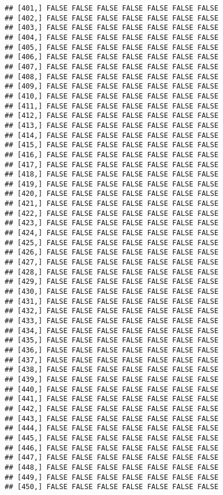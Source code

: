 \documentclass[
]{article}
\begin{document}
\begin{verbatim}
## [401,] FALSE FALSE FALSE FALSE FALSE FALSE FALSE
## [402,] FALSE FALSE FALSE FALSE FALSE FALSE FALSE
## [403,] FALSE FALSE FALSE FALSE FALSE FALSE FALSE
## [404,] FALSE FALSE FALSE FALSE FALSE FALSE FALSE
## [405,] FALSE FALSE FALSE FALSE FALSE FALSE FALSE
## [406,] FALSE FALSE FALSE FALSE FALSE FALSE FALSE
## [407,] FALSE FALSE FALSE FALSE FALSE FALSE FALSE
## [408,] FALSE FALSE FALSE FALSE FALSE FALSE FALSE
## [409,] FALSE FALSE FALSE FALSE FALSE FALSE FALSE
## [410,] FALSE FALSE FALSE FALSE FALSE FALSE FALSE
## [411,] FALSE FALSE FALSE FALSE FALSE FALSE FALSE
## [412,] FALSE FALSE FALSE FALSE FALSE FALSE FALSE
## [413,] FALSE FALSE FALSE FALSE FALSE FALSE FALSE
## [414,] FALSE FALSE FALSE FALSE FALSE FALSE FALSE
## [415,] FALSE FALSE FALSE FALSE FALSE FALSE FALSE
## [416,] FALSE FALSE FALSE FALSE FALSE FALSE FALSE
## [417,] FALSE FALSE FALSE FALSE FALSE FALSE FALSE
## [418,] FALSE FALSE FALSE FALSE FALSE FALSE FALSE
## [419,] FALSE FALSE FALSE FALSE FALSE FALSE FALSE
## [420,] FALSE FALSE FALSE FALSE FALSE FALSE FALSE
## [421,] FALSE FALSE FALSE FALSE FALSE FALSE FALSE
## [422,] FALSE FALSE FALSE FALSE FALSE FALSE FALSE
## [423,] FALSE FALSE FALSE FALSE FALSE FALSE FALSE
## [424,] FALSE FALSE FALSE FALSE FALSE FALSE FALSE
## [425,] FALSE FALSE FALSE FALSE FALSE FALSE FALSE
## [426,] FALSE FALSE FALSE FALSE FALSE FALSE FALSE
## [427,] FALSE FALSE FALSE FALSE FALSE FALSE FALSE
## [428,] FALSE FALSE FALSE FALSE FALSE FALSE FALSE
## [429,] FALSE FALSE FALSE FALSE FALSE FALSE FALSE
## [430,] FALSE FALSE FALSE FALSE FALSE FALSE FALSE
## [431,] FALSE FALSE FALSE FALSE FALSE FALSE FALSE
## [432,] FALSE FALSE FALSE FALSE FALSE FALSE FALSE
## [433,] FALSE FALSE FALSE FALSE FALSE FALSE FALSE
## [434,] FALSE FALSE FALSE FALSE FALSE FALSE FALSE
## [435,] FALSE FALSE FALSE FALSE FALSE FALSE FALSE
## [436,] FALSE FALSE FALSE FALSE FALSE FALSE FALSE
## [437,] FALSE FALSE FALSE FALSE FALSE FALSE FALSE
## [438,] FALSE FALSE FALSE FALSE FALSE FALSE FALSE
## [439,] FALSE FALSE FALSE FALSE FALSE FALSE FALSE
## [440,] FALSE FALSE FALSE FALSE FALSE FALSE FALSE
## [441,] FALSE FALSE FALSE FALSE FALSE FALSE FALSE
## [442,] FALSE FALSE FALSE FALSE FALSE FALSE FALSE
## [443,] FALSE FALSE FALSE FALSE FALSE FALSE FALSE
## [444,] FALSE FALSE FALSE FALSE FALSE FALSE FALSE
## [445,] FALSE FALSE FALSE FALSE FALSE FALSE FALSE
## [446,] FALSE FALSE FALSE FALSE FALSE FALSE FALSE
## [447,] FALSE FALSE FALSE FALSE FALSE FALSE FALSE
## [448,] FALSE FALSE FALSE FALSE FALSE FALSE FALSE
## [449,] FALSE FALSE FALSE FALSE FALSE FALSE FALSE
## [450,] FALSE FALSE FALSE FALSE FALSE FALSE FALSE

\end{verbatim}
\end{document}
